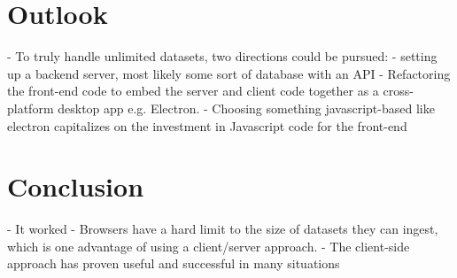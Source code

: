 
\section{Outlook}
\label{08-conclusions-outlook}

- To truly handle unlimited datasets, two directions could be pursued:
  - setting up a backend server, most likely some sort of database with an API
  - Refactoring the front-end code to embed the server and client code together as a cross-platform desktop app e.g. Electron.
  - Choosing something javascript-based like electron capitalizes on the investment in Javascript code for the front-end

\section{Conclusion}
\label{08-conclusions-conclusion}

- It worked
- Browsers have a hard limit to the size of datasets they can ingest, which is one advantage of using a client/server approach.
- The client-side approach has proven useful and successful in many situations

